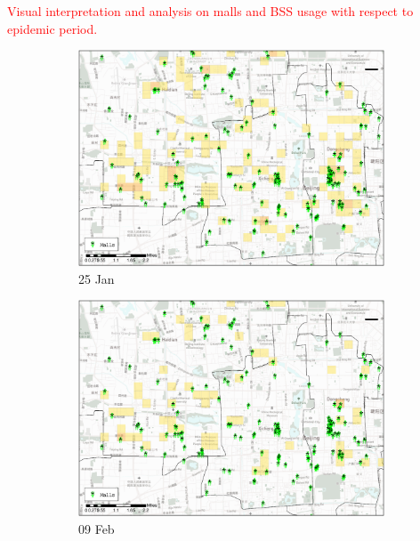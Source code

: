 \documentclass[preprints,ijgi,submit,moreauthors]{Definitions/mdpi}
\begin{document}
\textcolor{red}{Visual interpretation and analysis on malls and BSS usage with respect to epidemic period.}
\begin{figure}[H]
    \centering
    \begin{subfigure}{.23\textwidth}
        \includegraphics[width=\textwidth]{Figures/Figure10/POI_mallsD2020_01_25.eps}
        \caption{25 Jan}
    \end{subfigure}
    \begin{subfigure}{.23\textwidth}
        \includegraphics[width=\textwidth]{Figures/Figure10/POI_mallsD2020_02_09.eps}
        \caption{09 Feb}
    \end{subfigure}
    \begin{subfigure}{.23\textwidth}

\end{subfigure}
\end{figure}
\end{document}
